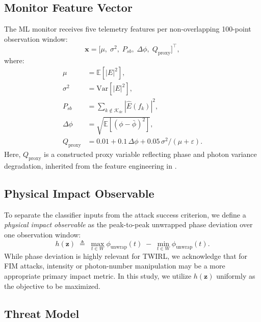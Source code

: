 \documentclass[journal,twocolumn]{IEEEtran}
\newcommand{\vx}{\mathbf{x}}
\newcommand{\vz}{\mathbf{z}}
\newcommand{\hobs}{h(\vz)}
\begin{document}
\subsection{Monitor Feature Vector}

The ML monitor receives five telemetry features per non-overlapping 100-point
observation window:
\begin{equation}
  \vx = \bigl[\mu,\;\sigma^2,\;P_{sb},\;\Delta\phi,\;Q_{\mathrm{proxy}}\bigr]^{\!\top},
\end{equation}
where:
\begin{align*}
  \mu       &= \mathbb{E}[|E|^2], \\
  \sigma^2  &= \mathrm{Var}[|E|^2], \\
  P_{sb}    &= \sum_{k \notin \mathcal{K}_\mathrm{dc}} |\hat{E}(f_k)|^2, \\
  \Delta\phi &= \sqrt{\mathbb{E}[(\phi-\bar{\phi})^2]}, \\
  Q_{\mathrm{proxy}}         &= 0.01 + 0.1\,\Delta\phi + 0.05\,\sigma^2/(\mu+\varepsilon).
\end{align*}
Here, $Q_{\mathrm{proxy}}$ is a constructed proxy variable reflecting phase and photon variance 
degradation, inherited from the feature engineering in \cite{basepaper}. 

\subsection{Physical Impact Observable}

To separate the classifier inputs from the attack success criterion, we define a \emph{physical impact observable} as the peak-to-peak unwrapped phase deviation over one observation window:
\begin{equation}
  \hobs \;\triangleq\; \max_{t\in W}\phi_{\mathrm{unwrap}}(t) \;-\; \min_{t\in W}\phi_{\mathrm{unwrap}}(t).
  \label{eq:impact}
\end{equation}
While phase deviation is highly relevant for TWIRL, we acknowledge that for FIM attacks, intensity or photon-number manipulation may be a more appropriate primary impact metric. In this study, we utilize $h(\vz)$ uniformly as the objective to be maximized.

\subsection{Threat Model}
\label{sec:threat}
\end{document}
